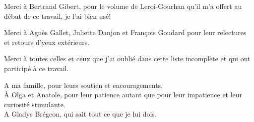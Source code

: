 \indent Merci à Bertrand Gibert, pour le volume de Leroi-Gourhan qu'il m'a offert au début de ce travail, je l'ai bien usé!

\indent Merci à Agnès Gallet, Juliette Danjon et François Goudard pour leur relectures et retours d'yeux extérieurs.

\indent Merci à toutes celles et ceux que j'ai oublié dans cette liste incomplète et qui ont participé à ce travail.

\indent A ma famille, pour leurs soutien et encouragements.\\
À Olga et Anatole, pour leur patience autant que pour leur impatience et leur curiosité stimulante.\\
A Gladys Brégeon, qui sait tout ce que je lui dois.
